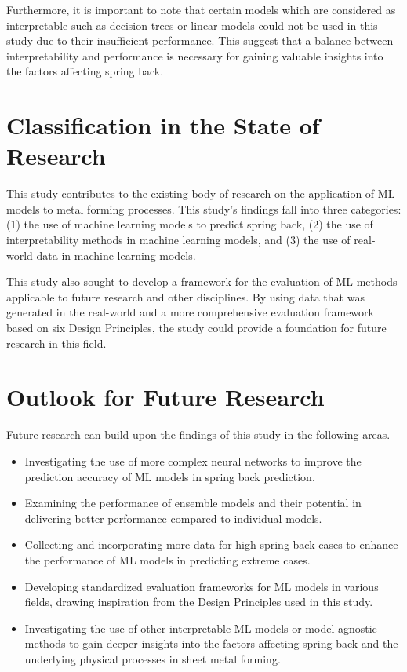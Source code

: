 Furthermore, it is important to note that certain models which are considered as interpretable such as decision trees
or linear models could not be used in this study due to their insufficient performance.
This suggest that a balance between interpretability and performance is necessary for gaining valuable insights into
the factors affecting spring back.


\section{Classification in the State of Research}\label{sec:classification-in-the-state-of-research}
This study contributes to the existing body of research on the application of ML models to metal forming processes.
This study's findings fall into three categories: (1) the use of machine learning models to predict spring back, (2)
the use of interpretability methods in machine learning models, and (3) the use of real-world data in machine
learning models.

This study also sought to develop a framework for the evaluation of ML methods applicable to future research and
other disciplines.
By using data that was generated in the real-world and a more comprehensive evaluation framework based on six Design
Principles, the study could provide a foundation for future research in this field.


\section{Outlook for Future Research}\label{sec:outlook-for-future-research}


Future research can build upon the findings of this study in the following areas.

\begin{itemize}
    \item Investigating the use of more complex neural networks to improve the prediction accuracy of ML models in
    spring back prediction.
    \item Examining the performance of ensemble models and their potential in delivering better performance compared to
    individual models.
    \item Collecting and incorporating more data for high spring back cases to enhance the performance of ML models in
    predicting extreme cases.
    \item Developing standardized evaluation frameworks for ML models in various fields, drawing inspiration from the
    Design Principles used in this study.
    \item Investigating the use of other interpretable ML models or model-agnostic methods to gain deeper insights
    into the factors affecting spring back and the underlying physical processes in sheet metal forming.
\end{itemize}

